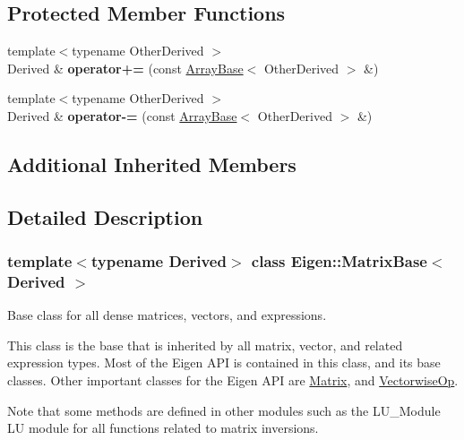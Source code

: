 \subsection*{Protected Member Functions}
\begin{DoxyCompactItemize}
\item 
\mbox{\label{class_eigen_1_1_matrix_base_a4edae1d58e56f4723c08f8d2901d7f08}} 
{\footnotesize template$<$typename Other\+Derived $>$ }\\Derived \& {\bfseries operator+=} (const \mbox{\hyperlink{class_eigen_1_1_array_base}{Array\+Base}}$<$ Other\+Derived $>$ \&)
\item 
\mbox{\label{class_eigen_1_1_matrix_base_a2f8a59961910894b9027f583ba4288c0}} 
{\footnotesize template$<$typename Other\+Derived $>$ }\\Derived \& {\bfseries operator-\/=} (const \mbox{\hyperlink{class_eigen_1_1_array_base}{Array\+Base}}$<$ Other\+Derived $>$ \&)
\end{DoxyCompactItemize}
\subsection*{Additional Inherited Members}


\subsection{Detailed Description}
\subsubsection*{template$<$typename Derived$>$\newline
class Eigen\+::\+Matrix\+Base$<$ Derived $>$}

Base class for all dense matrices, vectors, and expressions. 

This class is the base that is inherited by all matrix, vector, and related expression types. Most of the Eigen A\+PI is contained in this class, and its base classes. Other important classes for the Eigen A\+PI are \mbox{\hyperlink{class_eigen_1_1_matrix}{Matrix}}, and \mbox{\hyperlink{class_eigen_1_1_vectorwise_op}{Vectorwise\+Op}}.

Note that some methods are defined in other modules such as the L\+U\+\_\+\+Module LU module for all functions related to matrix inversions.


